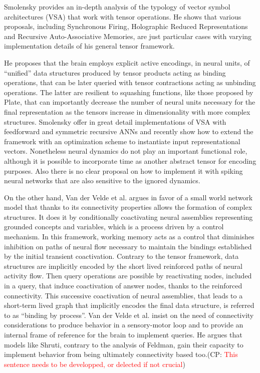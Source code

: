 \documentclass[10pt]{article}
\newcommand{\noteCP}[1]{(CP: \textcolor{red}{#1})}
\begin{document}
Smolensky provides an in-depth analysis of the typology of vector symbol architectures (VSA) that work with tensor operations.
He shows that various proposals, including Synchronous Firing\cite{Shastri_1993}, Holographic Reduced Representations\cite{Plate_1995} and Recursive Auto-Associative Memories\cite{Chalmers_1992}, are just particular cases with varying implementation details of his general tensor framework.

He proposes that the brain employs explicit active encodings, in neural units, of ``unified'' data structures produced by tensor products acting as binding operations, that can be later queried with tensor contractions acting as unbinding operations.
The latter are resilient to squashing functions, like those proposed by Plate, that can importantly decrease the number of neural units necessary for the final representation as the tensors increase in dimensionality with more complex structures.
Smolensky offer in great detail implementations of VSA with feedforward and symmetric recursive ANNs\cite{smolensky2006harmonic} and recently show how to extend the framework with an optimization scheme to instantiate input representational vectors\cite{Smolensky_2013}.
Nonetheless neural dynamics do not play an important functional role, although it is possible to incorporate time as another abstract tensor for encoding purposes.
Also there is no clear proposal on how to implement it with spiking neural networks that are also sensitive to the ignored dynamics.

On the other hand, Van der Velde et al.\cite{van_der_Velde_2015} argues in favor of a small world network model that thanks to its connectivity properties allows the formation of complex structures.
It does it by conditionally coactivating neural assemblies representing grounded concepts and variables, which is a process driven by a control mechanism.
In this framework, working memory acts as a control that diminishes inhibition on paths of neural flow necessary to maintain the bindings established by the initial transient coactivation.
Contrary to the tensor framework, data structures are implicitly encoded by the short lived reinforced paths of neural activity flow.
Then query operations are possible by reactivating nodes, included in a query, that induce coactivation of answer nodes, thanks to the reinforced connectivity.
This successive coactivation of neural assemblies, that leads to a short-term lived graph that implicitly encodes the final data structure, is referred to as ``binding by process''.
Van der Velde et al. insist on the need of connectivity considerations to produce behavior in a sensory-motor loop and to provide an internal frame of reference for the brain to implement queries.
He argues that models like Shruti\cite{Shastri_1993}, contrary to the analysis of Feldman\cite{Feldman_2012}, gain their capacity to implement behavior from being ultimately connectivity based too.\noteCP{This sentence needs to be developped, or delected if not crucial}
\end{document}
